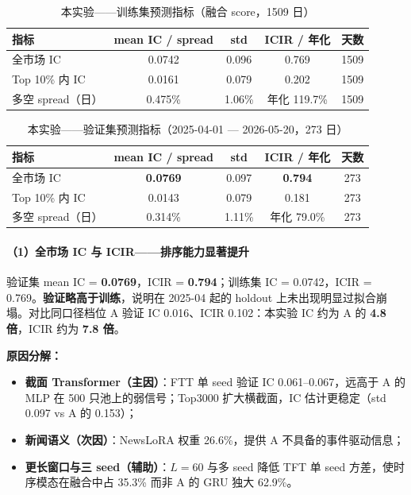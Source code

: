 \documentclass[UTF8,a4paper,12pt]{ctexart}
\begin{document}
\begin{table}[H]
\centering
\caption{本实验——训练集预测指标（融合 score，1509 日）}
\label{tab:ic-train}
\begin{tabular}{lcccc}
\toprule
\textbf{指标} & \textbf{mean IC / spread} & \textbf{std} & \textbf{ICIR / 年化} & \textbf{天数} \\
\midrule
全市场 IC     & 0.0742 & 0.096 & 0.769 & 1509 \\
Top 10\% 内 IC & 0.0161 & 0.079 & 0.202 & 1509 \\
多空 spread（日） & 0.475\% & 1.06\% & 年化 119.7\% & 1509 \\
\bottomrule
\end{tabular}
\end{table}

\begin{table}[H]
\centering
\caption{本实验——验证集预测指标（2025-04-01 --- 2026-05-20，273 日）}
\label{tab:ic-valid}
\begin{tabular}{lcccc}
\toprule
\textbf{指标} & \textbf{mean IC / spread} & \textbf{std} & \textbf{ICIR / 年化} & \textbf{天数} \\
\midrule
全市场 IC     & \textbf{0.0769} & 0.097 & \textbf{0.794} & 273 \\
Top 10\% 内 IC & 0.0143 & 0.079 & 0.181 & 273 \\
多空 spread（日） & 0.314\% & 1.11\% & 年化 79.0\% & 273 \\
\bottomrule
\end{tabular}
\end{table}

\paragraph{（1）全市场 IC 与 ICIR——排序能力显著提升}

验证集 mean IC = \textbf{0.0769}，ICIR = \textbf{0.794}；训练集 IC = 0.0742，ICIR = 0.769。\textbf{验证略高于训练}，说明在 2025-04 起的 holdout 上未出现明显过拟合崩塌。对比同口径档位 A 验证 IC 0.016、ICIR 0.102：本实验 IC 约为 A 的 \textbf{4.8 倍}，ICIR 约为 \textbf{7.8 倍}。

\textbf{原因分解：}
\begin{itemize}[leftmargin=2em]
  \item \textbf{截面 Transformer（主因）}：FTT 单 seed 验证 IC 0.061--0.067，远高于 A 的 MLP 在 500 只池上的弱信号；Top3000 扩大横截面，IC 估计更稳定（std 0.097 vs A 的 0.153）；
  \item \textbf{新闻语义（次因）}：NewsLoRA 权重 26.6\%，提供 A 不具备的事件驱动信息；
  \item \textbf{更长窗口与三 seed（辅助）}：$L=60$ 与多 seed 降低 TFT 单 seed 方差，使时序模态在融合中占 35.3\% 而非 A 的 GRU 独大 62.9\%。
\end{itemize}
\end{document}
